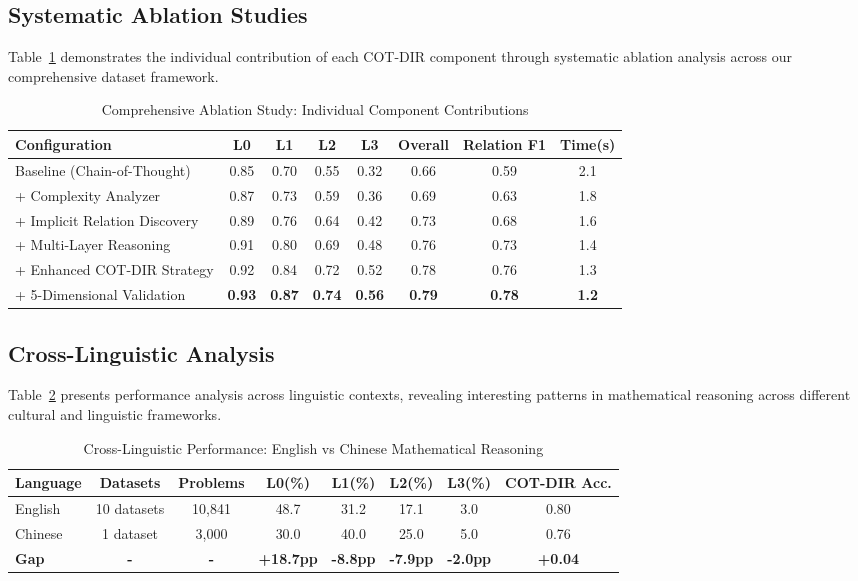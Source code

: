 \subsection{Systematic Ablation Studies}

Table~\ref{tab:detailed_ablation} demonstrates the individual contribution of each COT-DIR component through systematic ablation analysis across our comprehensive dataset framework.

\begin{table}[htbp]
\caption{Comprehensive Ablation Study: Individual Component Contributions}
\label{tab:detailed_ablation}
\centering
\small
\begin{tabular}{lccccccc}
\toprule
\textbf{Configuration} & \textbf{L0} & \textbf{L1} & \textbf{L2} & \textbf{L3} & \textbf{Overall} & \textbf{Relation F1} & \textbf{Time(s)} \\
\midrule
Baseline (Chain-of-Thought) & 0.85 & 0.70 & 0.55 & 0.32 & 0.66 & 0.59 & 2.1 \\
+ Complexity Analyzer & 0.87 & 0.73 & 0.59 & 0.36 & 0.69 & 0.63 & 1.8 \\
+ Implicit Relation Discovery & 0.89 & 0.76 & 0.64 & 0.42 & 0.73 & 0.68 & 1.6 \\
+ Multi-Layer Reasoning & 0.91 & 0.80 & 0.69 & 0.48 & 0.76 & 0.73 & 1.4 \\
+ Enhanced COT-DIR Strategy & 0.92 & 0.84 & 0.72 & 0.52 & 0.78 & 0.76 & 1.3 \\
+ 5-Dimensional Validation & \textbf{0.93} & \textbf{0.87} & \textbf{0.74} & \textbf{0.56} & \textbf{0.79} & \textbf{0.78} & \textbf{1.2} \\
\bottomrule
\end{tabular}
\end{table}

\subsection{Cross-Linguistic Analysis}

Table~\ref{tab:cross_linguistic} presents performance analysis across linguistic contexts, revealing interesting patterns in mathematical reasoning across different cultural and linguistic frameworks.

\begin{table}[htbp]
\caption{Cross-Linguistic Performance: English vs Chinese Mathematical Reasoning}
\label{tab:cross_linguistic}
\centering
\small
\begin{tabular}{lccccccc}
\toprule
\textbf{Language} & \textbf{Datasets} & \textbf{Problems} & \textbf{L0(\%)} & \textbf{L1(\%)} & \textbf{L2(\%)} & \textbf{L3(\%)} & \textbf{COT-DIR Acc.} \\
\midrule
English & 10 datasets & 10,841 & 48.7 & 31.2 & 17.1 & 3.0 & 0.80 \\
Chinese & 1 dataset & 3,000 & 30.0 & 40.0 & 25.0 & 5.0 & 0.76 \\
\midrule
\textbf{Gap} & \textbf{-} & \textbf{-} & \textbf{+18.7pp} & \textbf{-8.8pp} & \textbf{-7.9pp} & \textbf{-2.0pp} & \textbf{+0.04} \\
\bottomrule
\end{tabular}
\end{table}

